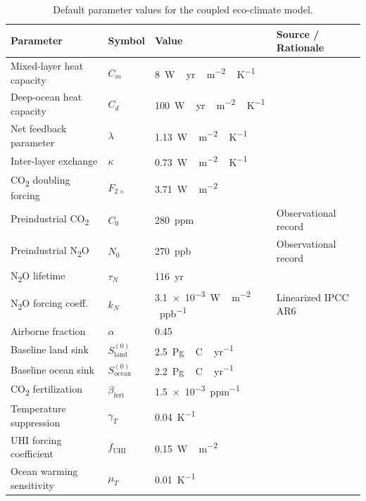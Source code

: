 \documentclass[12pt]{article}
\begin{document}
\begin{table}[htbp]
  \centering
  \caption{Default parameter values for the coupled eco-climate model.}
  \label{tab:params}
  \renewcommand{\arraystretch}{1.25}
  \begin{tabular}{llll}
    \toprule
    Parameter & Symbol & Value & Source / Rationale \\
    \midrule
    Mixed-layer heat capacity    & $C_m$              & \SI{8}{W\,yr\,m^{-2}\,K^{-1}}   & \citet{Geoffroy2013} \\
    Deep-ocean heat capacity     & $C_d$              & \SI{100}{W\,yr\,m^{-2}\,K^{-1}} & \citet{Geoffroy2013} \\
    Net feedback parameter       & $\lambda$          & \SI{1.13}{W\,m^{-2}\,K^{-1}}    & \citet{Geoffroy2013} \\
    Inter-layer exchange         & $\kappa$           & \SI{0.73}{W\,m^{-2}\,K^{-1}}    & \citet{Geoffroy2013} \\
    CO\textsubscript{2} doubling forcing & $F_{2\times}$ & \SI{3.71}{W\,m^{-2}}        & \citet{Myhre1998}    \\
    Preindustrial CO\textsubscript{2}    & $C_0$         & \SI{280}{ppm}                & Observational record \\
    Preindustrial N\textsubscript{2}O    & $N_0$         & \SI{270}{ppb}                & Observational record \\
    N\textsubscript{2}O lifetime         & $\tau_N$      & \SI{116}{yr}                 & \citet{Prather2026}  \\
    N\textsubscript{2}O forcing coeff.   & $k_N$         & \SI{3.1e-3}{W\,m^{-2}\,ppb^{-1}} & Linearized IPCC AR6 \\
    Airborne fraction            & $\alpha$           & 0.45                             & \citet{Canadell2007} \\
    Baseline land sink           & $S_{\mathrm{land}}^{(0)}$ & \SI{2.5}{Pg\,C\,yr^{-1}} & \citet{Ciais2013}    \\
    Baseline ocean sink          & $S_{\mathrm{ocean}}^{(0)}$ & \SI{2.2}{Pg\,C\,yr^{-1}} & \citet{Ciais2013}    \\
    CO\textsubscript{2} fertilization    & $\beta_{\mathrm{fert}}$ & \SI{1.5e-3}{ppm^{-1}} & \citet{Friedlingstein2014} \\
    Temperature suppression      & $\gamma_T$         & \SI{0.04}{K^{-1}}               & \citet{Davidson2006} \\
    UHI forcing coefficient      & $f_{\mathrm{UHI}}$ & \SI{0.15}{W\,m^{-2}}            & \citet{Zhao2014}     \\
    Ocean warming sensitivity    & $\mu_T$            & \SI{0.01}{K^{-1}}               & \citet{Friedlingstein2014} \\
    \bottomrule
  \end{tabular}
\end{table}
\end{document}
